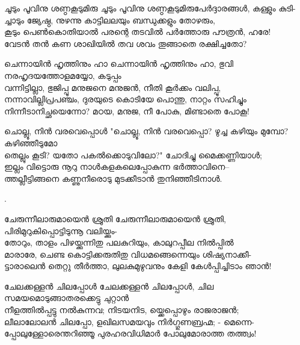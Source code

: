 \begin{enumerate}

\begin{slokam}{\VSv}{\VKG}{ചൂടും പൂവിനു ശണ്ഠകൂടുമിരു}
ചൂടും പൂവിനു ശണ്ഠകൂടുമിരുപേർദ്ദാരങ്ങള്‍, കള്ളും കുടി-\\
ച്ചാടും ജ്യേഷ്ഠ, നുഴന്നു കാട്ടിലലയും ബന്ധുക്കളും തോഴരും,\\
കൂടും പെൺകൊതിയാൽ പരന്റെ തടവിൽ പർത്തോരു പൗത്രൻ, ഹരേ!\\
വേടൻ തൻ കണ ശാഖിയിൽ തവ ശവം തൂങ്ങാതെ രക്ഷിച്ചതോ?
\end{slokam}



\begin{slokam}{\VSr}{\CKP}{ചെന്നായിൻ ഹൃത്തിനും ഹാ}
ചെന്നായിൻ ഹൃത്തിനും ഹാ, ഭുവി നരഹൃദയത്തോളമയ്യോ, കടുപ്പം\\
വന്നിട്ടില്ലാ, ഭുജിപ്പൂ മനുജനെ മനുജൻ, നീതി കൂർക്കം വലിപ്പൂ,\\
നന്നാവില്ലിപ്രപഞ്ചം, ദുരയുടെ കൊടിയേ പൊന്തു, നാറ്റം സഹിച്ചും\\
നിന്നീടാനിച്ഛയെന്നോ? മഠയ, മനുജ, നീ പോകു, മിണ്ടാതെ പോകൂ!
\end{slokam}



\begin{slokam}{\VSv}{\UN}{ചൊല്ലൂ, നിൻ വരവെപ്പൊൾ}
  "ചൊല്ലൂ, നിൻ വരവെപ്പൊ? ഴുച്ച കഴിയും മുമ്പോ? കഴിഞ്ഞീടുമോ\\
  തെല്ലും കൂടി? യതോ പകൽക്കൊടുവിലോ?" ചോദിച്ചു മൈക്കണ്ണിയാൾ;\\
  ഇല്ലം വിട്ടൊരു നൂറു നാൾകളകലെപ്പോകുന്ന ഭർത്താവിനെ--\\
  ത്തല്ലീട്ടിങ്ങനെ കണ്ണുനീരൊടു മുടക്കീടാൻ തുനിഞ്ഞീടിനാൾ.
\end{slokam}
  

. 


\begin{slokam}{\VSr}{\Unk}{ചേരുന്നീലാരുമായെൻ ശ്രുതി}
ചേരുന്നീലാരുമായെൻ ശ്രുതി, പിരിമുറുകിപ്പൊട്ടിടുന്നൂ വലിയ്ക്കും-\\
തോറും, താളം പിഴയ്ക്കുന്നിതു പലകുറിയും, കാലുറപ്പീല നിൽപ്പിൽ\\
മാരാരേ, ചെണ്ട കൊട്ടിക്കരുതിതു വിധമങ്ങെന്നെയും ശിഷ്യനാക്കീ-\\
ട്ടാരാലെൻ തെറ്റു തീർത്താ, ലുലകുമുഴുവനും കേളി കേള്‍പ്പിച്ചിടാം ഞാൻ!
\end{slokam}



\begin{slokam}{\VSr}{\VKG}{ചേലക്കള്ളൻ ചിലപ്പോള്‍}
ചേലക്കള്ളൻ ചിലപ്പോള്‍, ചില സമയമൊടുങ്ങാതരക്കെട്ടു ചുറ്റാൻ\\
നീളത്തിൽപ്പട്ടു നൽകുന്നവ; നിടയനിട, യ്ക്കെപ്പൊഴും രാജരാജൻ;\\
ലീലാലോലൻ ചിലപ്പോ, ളഖിലസമയവും നിർഗ്ഗുണബ്രഹ്മ; - മെന്നെ-\\
പ്പോലുള്ളോരെന്തറിഞ്ഞൂ പുരഹരവിധിമാർ പോലുമോരാത്ത തത്ത്വം!
\end{slokam}


\end{enumerate}

